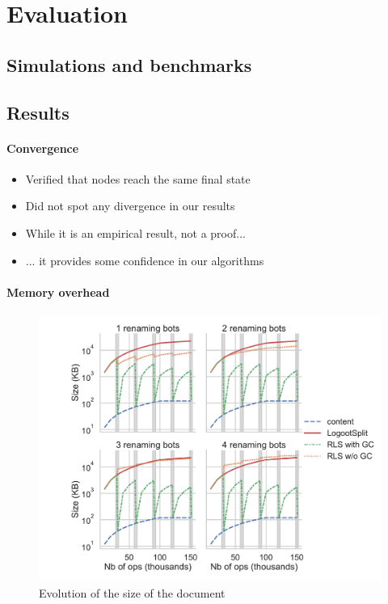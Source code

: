 \documentclass[sigplan,10pt]{acmart}
\begin{document}
\section{Evaluation}

\subsection{Simulations and benchmarks}


\subsection{Results}

\paragraph{Convergence}

\begin{itemize}
    \item Verified that nodes reach the same final state
    \item Did not spot any divergence in our results
    \item While it is an empirical result, not a proof...
    \item ... it provides some confidence in our algorithms
\end{itemize}

\paragraph{Memory overhead}

\begin{figure}[ht!]
    \centering
    \includegraphics[width=\columnwidth]{img/snapshot-sizes.pdf}
    \caption{Evolution of the size of the document}
    \label{fig:evolution-document-size}
\end{figure}
\end{document}
